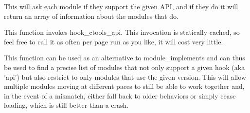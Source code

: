 This will ask each module if they support the given API, and if they do it will return an array of information about the modules that do.

This function invokes hook\_\-ctools\_\-api. This invocation is statically cached, so feel free to call it as often per page run as you like, it will cost very little.

This function can be used as an alternative to module\_\-implements and can thus be used to find a precise list of modules that not only support a given hook (aka 'api') but also restrict to only modules that use the given version. This will allow multiple modules moving at different paces to still be able to work together and, in the event of a mismatch, either fall back to older behaviors or simply cease loading, which is still better than a crash.


